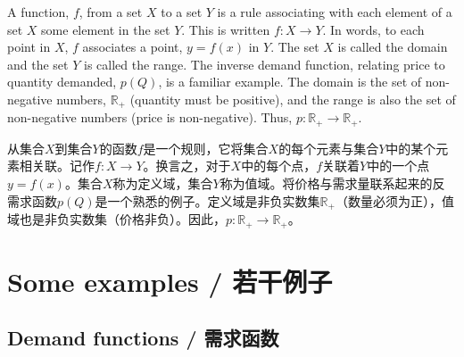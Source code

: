 \begin{original}
A function, $f$, from a set $X$ to a set $Y$ is a rule associating with each element of a set $X$ some element in the set $Y$. This is written $f: X \to Y$. In words, to each point in $X$, $f$ associates a point, $y = f(x)$ in $Y$. The set $X$ is called the domain and the set $Y$ is called the range. The inverse demand function, relating price to quantity demanded, $p(Q)$, is a familiar example. The domain is the set of non-negative numbers, $\mathbb{R}_+$ (quantity must be positive), and the range is also the set of non-negative numbers (price is non-negative). Thus, $p: \mathbb{R}_+ \to \mathbb{R}_+$.
\end{original}
\begin{translation}
从集合$X$到集合$Y$的函数$f$是一个规则，它将集合$X$的每个元素与集合$Y$中的某个元素相关联。记作$f: X \to Y$。换言之，对于$X$中的每个点，$f$关联着$Y$中的一个点$y = f(x)$。集合$X$称为定义域，集合$Y$称为值域。将价格与需求量联系起来的反需求函数$p(Q)$是一个熟悉的例子。定义域是非负实数集$\mathbb{R}_+$（数量必须为正），值域也是非负实数集（价格非负）。因此，$p: \mathbb{R}_+ \to \mathbb{R}_+$。
\end{translation}

\section{Some examples / 若干例子}

\subsection{Demand functions / 需求函数}

